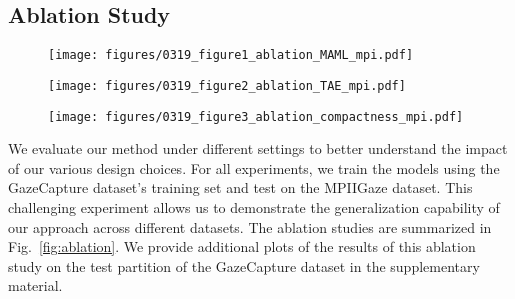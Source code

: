 \documentclass[10pt,twocolumn,letterpaper]{article}
\begin{document}
\subsection{Ablation Study}
\label{sec:ablation}

\begin{figure*}
    \centering
    \begin{subfigure}[b]{0.33\textwidth}
        \texttt{[image: figures/0319\_figure1\_ablation\_MAML\_mpi.pdf]}
        \vskip -1mm
        \caption{\vspace{-3mm}}
        \label{fig:maml-vs-nomaml}
    \end{subfigure}
    \hfill
    \begin{subfigure}[b]{0.33\textwidth}
        \texttt{[image: figures/0319\_figure2\_ablation\_TAE\_mpi.pdf]}
        \vskip -1mm
        \caption{\vspace{-3mm}}
        \label{fig:impact_of_loss_terms}
    \end{subfigure}
    \begin{subfigure}[b]{0.33\textwidth}
        \texttt{[image: figures/0319\_figure3\_ablation\_compactness\_mpi.pdf]}
        \vskip -1mm
        \caption{\vspace{-3mm}}
        \label{fig:impact_of_embedding consistency}
    \end{subfigure}
    \caption{\textbf{Ablation Study:} Impact of (a) learning the few-shot gaze estimator using MAML (Sec.~\ref{sec:MAML}) and using the transforming encoder-decoder for feature learning (Sec.~\ref{sec:RotAE}); (b) different loss terms in Eq. \eqref{eq:loss} for training the transforming encoder-decoder; and (c) comparison of the different variants of embedding consistency loss term (Eq. \eqref{eq:embedding consistency_loss}). 
    We provide additional results for the test partition of the GazeCapture dataset in the supplementary material. 
    \vspace{-5mm}
    }
    \label{fig:ablation}
\end{figure*}


We evaluate our method under different settings to better understand the impact of our various design choices. For all experiments, we train the models using the GazeCapture dataset's training set and test on the MPIIGaze dataset. This challenging experiment allows us to demonstrate the generalization capability of our approach across different datasets. The ablation studies are summarized in Fig.~\ref{fig:ablation}. We provide additional plots of the results of this ablation study on the test partition of the GazeCapture dataset in the supplementary material.
\end{document}
